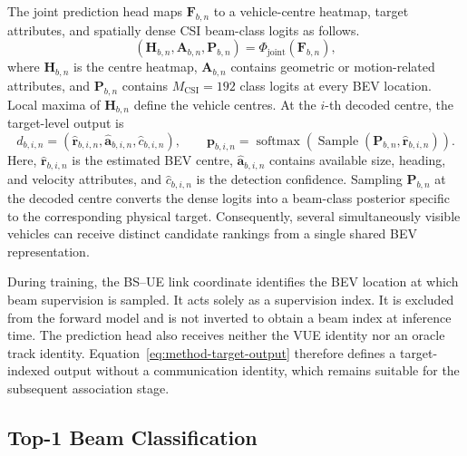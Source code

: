 The joint prediction head maps \(\mathbf{F}_{b,n}\) to a vehicle-centre
heatmap, target attributes, and spatially dense CSI beam-class logits as follows.
\begin{equation}
    \left(
    \mathbf{H}_{b,n},
    \mathbf{A}_{b,n},
    \mathbf{P}_{b,n}
    \right)
    =
    \Phi_{\mathrm{joint}}\!
    \left(\mathbf{F}_{b,n}\right),
    \label{eq:method-joint-head}
\end{equation}
where \(\mathbf{H}_{b,n}\) is the centre heatmap, \(\mathbf{A}_{b,n}\)
contains geometric or motion-related attributes, and
\(\mathbf{P}_{b,n}\) contains \(M_{\mathrm{CSI}}=192\) class logits at every BEV
location.  Local maxima of \(\mathbf{H}_{b,n}\) define the vehicle centres.  At
the \(i\)-th decoded centre, the target-level output is
\begin{equation}
    d_{b,i,n}
    =
    \left(
    \widehat{\mathbf{r}}_{b,i,n},
    \widehat{\mathbf{a}}_{b,i,n},
    \widehat{c}_{b,i,n}
    \right),\qquad
    \mathbf{p}_{b,i,n}
    =
    \operatorname{softmax}\!\left(
    \operatorname{Sample}
    \left(
    \mathbf{P}_{b,n},
    \widehat{\mathbf{r}}_{b,i,n}
    \right)
    \right).
    \label{eq:method-target-output}
\end{equation}
Here, \(\widehat{\mathbf{r}}_{b,i,n}\) is the estimated BEV centre,
\(\widehat{\mathbf{a}}_{b,i,n}\) contains available size, heading, and velocity
attributes, and \(\widehat{c}_{b,i,n}\) is the detection confidence.  Sampling
\(\mathbf{P}_{b,n}\) at the decoded centre converts the dense logits into a
beam-class posterior specific to the corresponding physical target.
Consequently, several simultaneously visible vehicles can receive distinct
candidate rankings from a single shared BEV representation.

During training, the BS--UE link coordinate identifies the BEV location at
which beam supervision is sampled.  It acts solely as a supervision index.  It
is excluded from the forward model and is not inverted to obtain a beam index at
inference time.  The prediction head also receives neither the VUE identity nor
an oracle track identity.  Equation~\eqref{eq:method-target-output} therefore
defines a target-indexed output without a communication identity, which remains
suitable for the subsequent association stage.

\subsection{Top-1 Beam Classification}
\label{subsec:method-top1-beam-classification}

